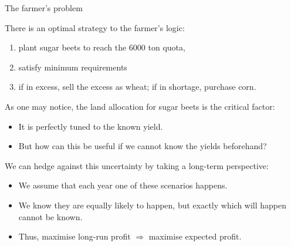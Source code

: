 \begin{frame}{The farmer's problem {\small \cite{birge2011introduction}}}
	
	There is an \alert{optimal strategy} to the farmer's logic:
	\vspace{-6pt} 
	\begin{enumerate}
		\item plant sugar beets to \alert{reach} the 6000 ton quota,
		\item satisfy \alert{minimum} requirements
		\item if in excess, sell the \alert{excess} as wheat; if in \alert{shortage}, purchase corn.
	\end{enumerate}	
	
	\pause
	As one may notice, the land allocation for sugar beets is the \alert{critical} factor:
	\vspace{-6pt} 
	\begin{itemize}
		\item It is perfectly tuned to the \alert{known yield}.
		\item But how can this be useful if we \alert{cannot} know the yields beforehand?
	\end{itemize}
	
	\pause
	We can \alert{hedge} against this uncertainty by taking a \alert{long-term perspective}:
	\vspace{-6pt} 
	\begin{itemize}
		\item We assume that each year one of these scenarios happens. 
		\item We know they are \alert{equally likely} to happen, but exactly which will happen cannot be known.
		\item Thus, maximise \alert{long-run} profit $\Rightarrow$ maximise \alert{expected profit}.
	\end{itemize}
	
\end{frame}


